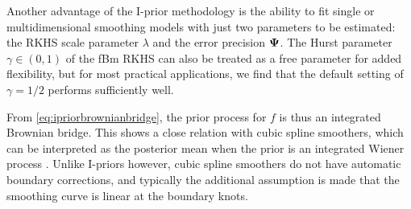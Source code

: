 

Another advantage of the I-prior methodology is the ability to fit single or multidimensional smoothing models with just two parameters to be estimated: the RKHS scale parameter $\lambda$ and the error precision ${\bm\Psi}$.
The Hurst parameter $\gamma \in (0,1)$ of the fBm RKHS can also be treated as a free parameter for added flexibility, but for most practical applications, we find that the default setting of $\gamma = 1/2$ performs sufficiently well.

\begin{remark}
  From \cref{eq:ipriorbrownianbridge}, the prior process for $f$ is thus an integrated Brownian bridge. 
  This shows a close relation with cubic spline smoothers, which can be interpreted as the posterior mean when the prior is an integrated Wiener process \citep{wahba1990spline}.
  Unlike I-priors however, cubic spline smoothers do not have automatic boundary corrections, and typically the additional assumption is made that the smoothing curve is linear at the boundary knots.
\end{remark}

